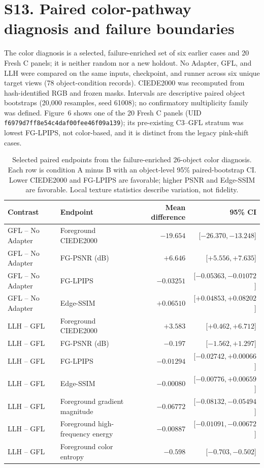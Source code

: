 \documentclass[11pt]{article}
\begin{document}
\clearpage
\section*{S13. Paired color-pathway diagnosis and failure boundaries}
The color diagnosis is a selected, failure-enriched set of six earlier cases and 20 Fresh C panels; it is neither random nor a new holdout. No Adapter, GFL, and LLH were compared on the same inputs, checkpoint, and runner across six unique target views (78 object-condition records). CIEDE2000 was recomputed from hash-identified RGB and frozen masks. Intervals are descriptive paired object bootstraps (20,000 resamples, seed 61008); no confirmatory multiplicity family was defined. Figure~6 shows one of the 20 Fresh C panels (UID \texttt{f6979d7ff8e54c4daf00fee46f09a139}); its pre-existing C3--GFL stratum was lowest FG-LPIPS, not color-based, and it is distinct from the legacy pink-shift cases.

\begin{table}[ht]
\centering\scriptsize
\caption{Selected paired endpoints from the failure-enriched 26-object color diagnosis. Each row is condition A minus B with an object-level 95\% paired-bootstrap CI. Lower CIEDE2000 and FG-LPIPS are favorable; higher PSNR and Edge-SSIM are favorable. Local texture statistics describe variation, not fidelity.}
\label{tab:color-diagnostic}
\begin{tabular}{llrr}
\toprule Contrast & Endpoint & Mean difference & 95\% CI \\
\midrule
GFL -- No Adapter & Foreground CIEDE2000 & $-19.654$ & [$-26.370,-13.248$] \\
GFL -- No Adapter & FG-PSNR (dB) & $+6.646$ & [$+5.556,+7.635$] \\
GFL -- No Adapter & FG-LPIPS & $-0.03251$ & [$-0.05363,-0.01072$] \\
GFL -- No Adapter & Edge-SSIM & $+0.06510$ & [$+0.04853,+0.08202$] \\
LLH -- GFL & Foreground CIEDE2000 & $+3.583$ & [$+0.462,+6.712$] \\
LLH -- GFL & FG-PSNR (dB) & $-0.197$ & [$-1.562,+1.297$] \\
LLH -- GFL & FG-LPIPS & $-0.01294$ & [$-0.02742,+0.00066$] \\
LLH -- GFL & Edge-SSIM & $-0.00080$ & [$-0.00776,+0.00659$] \\
LLH -- GFL & Foreground gradient magnitude & $-0.06772$ & [$-0.08132,-0.05494$] \\
LLH -- GFL & Foreground high-frequency energy & $-0.00887$ & [$-0.01091,-0.00672$] \\
LLH -- GFL & Foreground color entropy & $-0.598$ & [$-0.703,-0.502$] \\
\bottomrule
\end{tabular}
\end{table}
\end{document}
